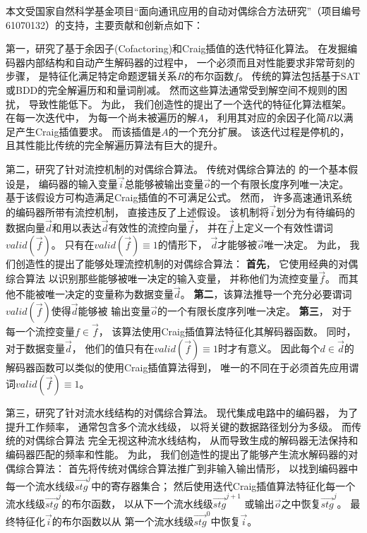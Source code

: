 本文受国家自然科学基金项目“面向通讯应用的自动对偶综合方法研究”（项目编号61070132）的支持，主要贡献和创新点如下：



第一，研究了基于余因子(Cofactoring)和Craig插值的迭代特征化算法。
在发掘编码器内部结构和自动产生解码器的过程中，
一个必须而且对性能要求非常苛刻的步骤，
是特征化满足特定命题逻辑关系$R$的布尔函数$f$。
传统的算法包括基于SAT或BDD的完全解遍历和和量词削减。
然而这些算法通常受到解空间不规则的困扰，
导致性能低下。
为此，
我们创造性的提出了一个迭代的特征化算法框架。
在每一次迭代中，
为每一个尚未被遍历的解$A$，
利用其对应的余因子化简$R$以满足产生Craig插值要求。
而该插值是$A$的一个充分扩展。
该迭代过程是停机的，
且其性能比传统的完全解遍历算法有巨大的提升。

第二，研究了针对流控机制的对偶综合算法。
传统对偶综合算法的 的一个基本假设是，
编码器的输入变量$\vec{i}$总能够被输出变量$\vec{o}$的一个有限长度序列唯一决定。
基于该假设方可构造满足Craig插值的不可满足公式。
然而，
许多高速通讯系统的编码器所带有流控机制，
直接违反了上述假设。
该机制将$\vec{i}$划分为有待编码的数据向量$\vec{d}$和用以表达$\vec{d}$有效性的流控向量$\vec{f}$，
并在$\vec{f}$上定义一个有效性谓词$valid(\vec{f})$。
只有在$valid(\vec{f})\equiv 1$的情形下，
$\vec{d}$才能够被$\vec{o}$唯一决定。
为此，
我们创造性的提出了能够处理流控机制的对偶综合算法：
\textbf{首先}，
它使用经典的对偶综合算法
以识别那些能够被唯一决定的输入变量，
并称他们为流控变量$\vec{f}$。
而其他不能被唯一决定的变量称为数据变量$\vec{d}$。
\textbf{第二}，该算法推导一个充分必要谓词$valid(\vec{f})$使得$\vec{d}$能够被
输出变量$\vec{o}$的一个有限长度序列唯一决定。
\textbf{第三}，
对于每一个流控变量$f\in\vec{f}$，
该算法使用Craig插值算法特征化其解码器函数。
同时，
对于数据变量$\vec{d}$，
他们的值只有在$valid(\vec{f}) \equiv 1$时才有意义。
因此每个$d\in\vec{d}$的解码器函数可以类似的使用Craig插值算法得到，
唯一的不同在于必须首先应用谓词$valid(\vec{f}) \equiv 1$。



第三，研究了针对流水线结构的对偶综合算法。
现代集成电路中的编码器，
为了提升工作频率，
通常包含多个流水线级，
以将关键的数据路径划分为多级。
而传统的对偶综合算法
完全无视这种流水线结构，
从而导致生成的解码器无法保持和编码器匹配的频率和性能。
为此，
我们创造性的提出了能够产生流水解码器的对偶综合算法：
首先将传统对偶综合算法推广到非输入输出情形，
以找到编码器中每一个流水线级$\vec{stg}^j$中的寄存器集合；
然后使用迭代Craig插值算法特征化每一个流水线级$\vec{stg}^j$的布尔函数，
以从下一个流水线级$\vec{stg}^{j+1}$ 或输出$\vec{o}$之中恢复$\vec{stg}^j$。
最终特征化$\vec{i}$的布尔函数以从
第一个流水线级$\vec{stg}^0$中恢复$\vec{i}$。


